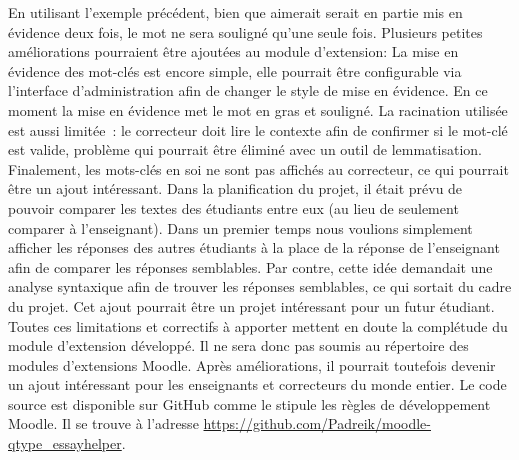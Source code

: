 En utilisant l'exemple pr\'ec\'edent, bien que \og aimerait \fg{} serait en partie mis en \'evidence deux fois, le mot ne sera soulign\'e qu'une seule fois.
Plusieurs petites am\'eliorations pourraient \^etre ajout\'ees au module d'extension:
La mise en \'evidence des mot-cl\'es est encore simple, elle pourrait \^etre configurable via l'interface d'administration afin de changer le style de mise en \'evidence.
En ce moment la mise en \'evidence met le mot en gras et soulign\'e.
La racination utilis\'ee est aussi limit\'ee~: le correcteur doit lire le contexte afin de confirmer si le mot-cl\'e est valide, probl\`eme qui pourrait \^etre \'elimin\'e avec un outil de lemmatisation.
Finalement, les mots-cl\'es en soi ne sont pas affich\'es au correcteur, ce qui pourrait \^etre un ajout int\'eressant.
Dans la planification du projet, il \'etait pr\'evu de pouvoir comparer les textes des \'etudiants entre eux (au lieu de seulement comparer \`a l'enseignant).
Dans un premier temps nous voulions simplement afficher les r\'eponses des autres \'etudiants \`a la place de la r\'eponse de l'enseignant afin de comparer les r\'eponses semblables.
Par contre, cette id\'ee demandait une analyse syntaxique afin de trouver les r\'eponses semblables, ce qui sortait du cadre du projet.
Cet ajout pourrait \^etre un projet int\'eressant pour un futur \'etudiant.
Toutes ces limitations et correctifs \`a apporter mettent en doute la compl\'etude du module d'extension d\'evelopp\'e.
Il ne sera donc pas soumis au r\'epertoire des modules d'extensions Moodle.
Apr\`es am\'eliorations, il pourrait toutefois devenir un ajout int\'eressant pour les enseignants et correcteurs du monde entier.
Le code source est disponible sur GitHub comme le stipule les r\`egles de d\'eveloppement Moodle.
Il se trouve \`a l'adresse \url{https://github.com/Padreik/moodle-qtype_essayhelper}.
